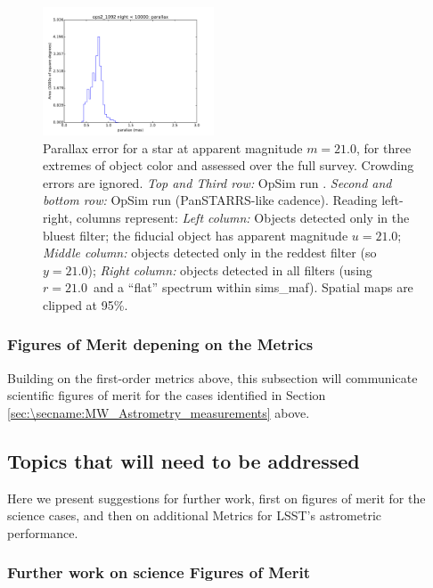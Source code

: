 \begin{figure}[ht]
\begin{center}
  \includegraphics[width=2.0in]{./figs/milkyway/MW_Astrom_paError_1092_10y_hst.pdf}
  \end{center}
  \caption{Parallax error for a star at apparent magnitude $m=21.0$, for three extremes of object color and assessed over the full survey. Crowding errors are ignored. {\it Top and Third row:} OpSim run . {\it Second and bottom row:} OpSim run  (PanSTARRS-like cadence). Reading left-right, columns represent: {\it Left column:} Objects detected only in the bluest filter; the fiducial object has apparent magnitude $u=21.0$; {\it Middle column:} objects detected only in the reddest filter (so $y = 21.0$); {\it Right column:} objects detected in all filters (using $r=21.0$~and a ``flat'' spectrum within sims\_maf). Spatial maps are clipped at 95\%.}
  \label{fig_astrom_ByFilter_paError}
\end{figure}

\subsubsection{Figures of Merit depening on the Metrics}

Building on the first-order metrics above, this subsection will communicate scientific figures of merit for the cases identified in Section \ref{sec:\secname:MW_Astrometry_measurements} above.


\subsection{Topics that will need to be addressed}
\label{sec:\secname:MW_Astrometry_furtherwork}

Here we present suggestions for further work, first on figures of
merit for the science cases, and then on additional Metrics for LSST's
astrometric performance.

\subsubsection{Further work on science Figures of Merit}

